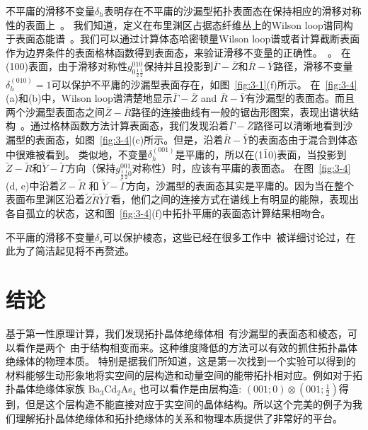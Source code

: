 不平庸的滑移不变量$\delta_h$表明存在不平庸的沙漏型拓扑表面态在保持相应的滑移对称性的表面上~\citep{wang2016hourglass,bernevigprx}。
我们知道，定义在布里渊区占据态纤维丛上的Wilson loop谱同构于表面态能谱~\citep{fidkowski2011model}。我们可以通过计算体态哈密顿量Wilson loop谱或者计算截断表面作为边界条件的表面格林函数得到表面态，来验证滑移不变量的正确性。~\citep{WU2017,Sancho_1985}。
在(100)表面，由于滑移对称性$g^{010}_{0\frac{1}{2}\frac{1}{2}}$保持并且投影到$\bar\Gamma-\bar Z$和$\bar R-\bar Y$路径，滑移不变量$\delta_{h}^{(010)}=1$可以保护不平庸的沙漏型表面存在，如图~\ref{fig:3-1}(f)所示。
在~\ref{fig:3-4} (a)和(b)中，Wilson loop谱清楚地显示$\bar\Gamma-\bar Z$ and $\bar R-\bar Y$有沙漏型的表面态。而且两个沙漏型表面态之间$\bar Z-\bar R$路径的连接曲线有一般的锯齿形图案，表现出谱状结构~\citep{bernevigprx}。通过格林函数方法计算表面态，我们发现沿着$\bar\Gamma-\bar Z$路径可以清晰地看到沙漏型的表面态，如图~\ref{fig:3-4}(c)所示。但是，沿着$\bar R-\bar Y$的表面态由于混合到体态中很难被看到。
类似地，不变量$\delta_{h}^{(001)}$是平庸的，所以在(1$\bar1$0)表面，当投影到$\tilde Z-\tilde R$和$\tilde Y-\tilde\Gamma$方向（保持$g^{001}_{\frac{1}{2} \frac{1}{2} 0 }$对称性）时，应该有平庸的表面态。
在图~\ref{fig:3-4}(d, e)中沿着$\tilde Z-\tilde R$ 和 $\tilde Y-\tilde\Gamma$方向，沙漏型的表面态其实是平庸的。因为当在整个表面布里渊区沿着$\tilde Z\tilde R\tilde Y\tilde\Gamma$看，他们之间的连接方式在谱线上有明显的能隙，表现出各自孤立的状态，这和图~\ref{fig:3-4}(f)中拓扑平庸的表面态计算结果相吻合。

不平庸的滑移不变量$\delta_s$可以保护棱态，这些已经在很多工作中~\citep{wang2016hourglass,Fangc2t,zhangt2019}被详细讨论过，在此为了简洁起见将不再赘述。


\section{结论}
基于第一性原理计算，我们发现拓扑晶体绝缘体相\tci~有沙漏型的表面态和棱态，可以看作是两个\ti~由于结构相变而来。这种维度降低的方法可以有效的抓住拓扑晶体绝缘体的物理本质。 
特别是据我们所知道，这是第一次找到一个实验可以得到的材料能够生动形象地将实空间的层构造和动量空间的能带拓扑相对应。例如对于拓扑晶体绝缘体家族 Ba$_3$Cd$_2$As$_4$ \citep{zhangt2019}也可以看作是由层构造: $(001;0){\otimes} (001;\frac{1}{2})$得到，但是这个层构造不能直接对应于实空间的晶体结构。所以这个完美的例子为我们理解拓扑晶体绝缘体和拓扑绝缘体的关系和物理本质提供了非常好的平台。